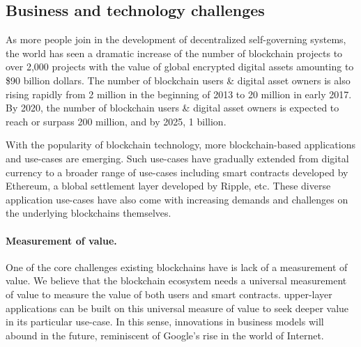\subsection{Business and technology challenges}
As more people join in the development of decentralized self-governing systems, the world has seen a dramatic increase of the number of blockchain projects to over 2,000 projects with the value of global encrypted digital assets amounting to \$90 billion dollars. The number of blockchain users \& digital asset owners is also rising rapidly from 2 million in the beginning of 2013 to 20 million in early 2017. By 2020, the number of blockchain users \& digital asset owners is expected to reach or surpass 200 million, and by 2025, 1 billion.

With the popularity of blockchain technology, more blockchain-based applications and use-cases are emerging.  Such use-cases have gradually extended from digital currency to a broader range of use-cases including smart contracts developed by Ethereum, a blobal settlement layer developed by Ripple, etc. These diverse application use-cases have also come with increasing demands and challenges on the underlying blockchains themselves.

\paragraph{Measurement of value.} One of the core challenges existing blockchains have is lack of a measurement of value. We believe that the blockchain ecosystem needs a universal measurement of value to measure the value of both users and smart contracts. upper-layer applications can be built on this universal measure of value to seek deeper value in its particular use-case. In this sense, innovations in business models will abound in the future, reminiscent of Google's rise in the world of Internet. 

